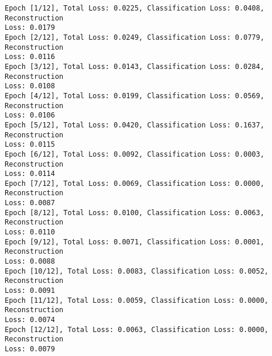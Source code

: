 \documentclass[11pt]{article}
\begin{document}
    \begin{Verbatim}[commandchars=\\\{\}]
Epoch [1/12], Total Loss: 0.0225, Classification Loss: 0.0408, Reconstruction
Loss: 0.0179
Epoch [2/12], Total Loss: 0.0249, Classification Loss: 0.0779, Reconstruction
Loss: 0.0116
Epoch [3/12], Total Loss: 0.0143, Classification Loss: 0.0284, Reconstruction
Loss: 0.0108
Epoch [4/12], Total Loss: 0.0199, Classification Loss: 0.0569, Reconstruction
Loss: 0.0106
Epoch [5/12], Total Loss: 0.0420, Classification Loss: 0.1637, Reconstruction
Loss: 0.0115
Epoch [6/12], Total Loss: 0.0092, Classification Loss: 0.0003, Reconstruction
Loss: 0.0114
Epoch [7/12], Total Loss: 0.0069, Classification Loss: 0.0000, Reconstruction
Loss: 0.0087
Epoch [8/12], Total Loss: 0.0100, Classification Loss: 0.0063, Reconstruction
Loss: 0.0110
Epoch [9/12], Total Loss: 0.0071, Classification Loss: 0.0001, Reconstruction
Loss: 0.0088
Epoch [10/12], Total Loss: 0.0083, Classification Loss: 0.0052, Reconstruction
Loss: 0.0091
Epoch [11/12], Total Loss: 0.0059, Classification Loss: 0.0000, Reconstruction
Loss: 0.0074
Epoch [12/12], Total Loss: 0.0063, Classification Loss: 0.0000, Reconstruction
Loss: 0.0079
    \end{Verbatim}
\end{document}
